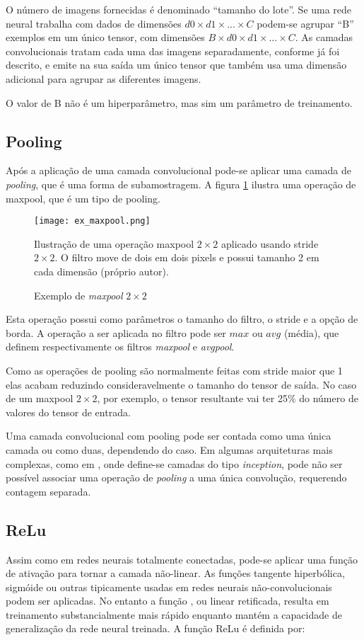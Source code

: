 O número de imagens fornecidas é denominado ``tamanho do lote''. Se uma rede
neural trabalha com dados de dimensões $d0 \times d1 \times ... \times C$
podem-se agrupar “B” exemplos em
um único tensor, com dimensões $B \times d0 \times d1 \times ... \times C$.
As camadas convolucionais tratam cada
uma das imagens separadamente, conforme já foi descrito, e emite na sua saída um
único tensor que também usa uma dimensão adicional para agrupar as diferentes
imagens.

O valor de B não é um hiperparâmetro, mas sim um parâmetro de treinamento.

\subsection{Pooling}
Após a aplicação de uma camada convolucional pode-se aplicar uma camada de
\emph{pooling}, que é uma forma de subamostragem. A figura
\ref{fig:ex_maxpool} ilustra uma operação de maxpool, que é um tipo de
pooling.

\begin{figure}[!htb]
	\centering
	\texttt{[image: ex\_maxpool.png]}
	\caption{Exemplo de \emph{maxpool} $2 \times 2$}
	\label{fig:ex_maxpool}
	Ilustração de uma operação maxpool $2 \times 2$ aplicado usando stride
	$2 \times 2$. O filtro move de dois em dois pixels e possui
	tamanho 2 em cada dimensão (próprio autor).
\end{figure}

Esta operação possui como parâmetros o tamanho do filtro, o stride e a opção de
borda. A operação a ser aplicada no filtro pode ser $max$ ou $avg$ (média),
que definem respectivamente os filtros \emph{maxpool} e \emph{avgpool}.

Como as operações de pooling são normalmente feitas com stride maior que 1 elas
acabam reduzindo consideravelmente o tamanho do tensor de saída. No caso de um
maxpool $2 \times 2$, por exemplo, o tensor resultante vai ter 25\% do
número de valores do tensor de entrada.

Uma camada convolucional com pooling pode ser contada como uma única camada ou
como duas, dependendo do caso. Em algumas arquiteturas mais complexas, como em
\cite{szegedy2015going}, onde define-se camadas do tipo \emph{inception},
pode não ser possível associar uma operação de \emph{pooling} a uma única
convolução, requerendo contagem separada.

\subsection{ReLu}
Assim como em redes neurais totalmente conectadas, pode-se aplicar uma função
de ativação para tornar a camada não-linear. As funções tangente
hiperbólica, sigmóide ou outras tipicamente usadas em redes neurais
não-convolucionais podem ser aplicadas. No entanto a função
, ou
linear retificada, resulta em treinamento substancialmente mais rápido enquanto
mantém a capacidade de generalização da rede neural treinada. A função
ReLu é definida por:


